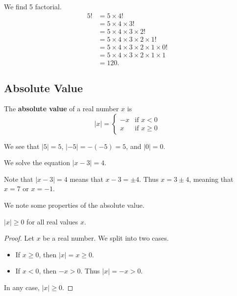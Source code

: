 \begin{example}
    We find 5 factorial.
    \begin{align*}
        5! &= 5 \times 4!\\
        &= 5 \times 4 \times 3!\\
        &= 5 \times 4 \times 3 \times 2!\\
        &= 5 \times 4 \times 3 \times 2 \times 1!\\
        &= 5 \times 4 \times 3 \times 2 \times 1 \times 0!\\
        &= 5 \times 4 \times 3 \times 2  \times 1  \times 1\\
        &= 120.
    \end{align*}
\end{example}

\subsection{Absolute Value}
\begin{definition}
    The \textbf{absolute value} of a real number $x$ is
    \[
        |x| = \begin{cases}
            -x & \text{if } x < 0\\
            x & \text{if } x \geq 0
        \end{cases}
    \]
\end{definition}

\begin{example}
    We see that $|5| = 5$, $|-5| = -(-5) = 5$, and $|0| = 0$.
\end{example}

\begin{example}
    We solve the equation $|x-3| = 4$.

    Note that $|x-3| = 4$ means that $x-3 = \pm 4$. Thus $x = 3 \pm 4$, meaning that $x = 7$ or $x = -1$.
\end{example}

We note some properties of the absolute value.
\begin{proposition}
    $|x| \geq 0$ for all real values $x$.
\end{proposition}
\begin{proof}
    Let $x$ be a real number. We split into two cases.
    \begin{itemize}
        \item If $x \geq 0$, then $|x| = x \geq 0$.
        \item If $x < 0$, then $-x > 0$. Thus $|x| = -x > 0$.
    \end{itemize}
    In any case, $|x| \geq 0$.
\end{proof}

